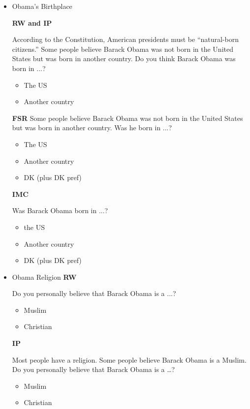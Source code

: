 \begin{itemize}
\item Obama's Birthplace

\textbf{RW and IP}\newline

According to the Constitution, American presidents must be ``natural-born citizens.''
Some people believe Barack Obama was not born in the United States but was born
in another country. Do you think Barack Obama was born in ...?
\begin{itemize}
	\item The US
	\item Another country
\end{itemize}

\textbf{FSR}\newline
Some people believe Barack Obama was not born in the United States but was born
in another country. Was he born in ...?
\begin{itemize}
	\item The US
	\item Another country
	\item DK (plus DK pref)
\end{itemize}

\textbf{IMC}\newline

Was Barack Obama born in ...?
\begin{itemize}
	\item the US
	\item Another country
	\item DK (plus DK pref)
\end{itemize}

\item Obama Religion\newline
\textbf{RW}\newline

Do you personally believe that Barack Obama is a ...?
\begin{itemize}
	\item Muslim
	\item Christian
\end{itemize}

\textbf{IP}\newline

Most people have a religion. Some people believe Barack Obama is a Muslim. Do you personally believe that Barack Obama is a \ldots?
\begin{itemize}
	\item Muslim
	\item Christian
\end{itemize}


\end{itemize}
